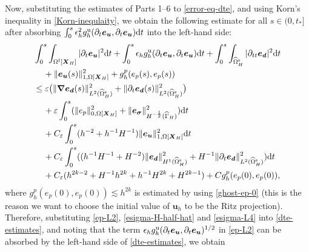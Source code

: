 \documentclass[11pt,reqno]{amsart}
\theoremstyle{definition}
\theoremstyle{plain}
\numberwithin{theorem}{section}
\numberwithin{proposition}{section}
\numberwithin{lemma}{section}
\numberwithin{equation}{section}
\newcommand{\bs}[1]{\boldsymbol{#1}}
\newcommand{\uu}[1]  {{\bs{#1}} }
\newcommand{\dep}{{{\bs{d}}}}
\newcommand{\grad}   { \uu{\nabla}    }
\def\d{\mathrm{d}}
\def\b{\color{blue}}
\renewcommand{\(}{\bigl(}
\renewcommand{\)}{\bigr)}
\begin{document}
Now, substituting the estimates of Parts 1--6 to \eqref{error-eq-dte}, and using Korn's inequality in \eqref{Korn-inequlaity}, we obtain the following estimate for all $s\in(0,t_*]$ after absorbing $\int_0^s \epsilon_h^2
g_h^{\rm u}(\partial_t{\bs e}_{\bs u},\partial_t{\bs e}_{\bs u}) \d t  $ into the left-hand side:
\begin{align} \label{dte-estimates}
& \int_0^s \int_{\Omega^{\rm f}[\bs X_H]} |\partial_t {\bs e}_{\bs u} |^2 \d t
+ \int_0^s \epsilon_h g_h^{\rm u} (\partial_t{\bs e}_{\bs u}, \partial_t{\bs e}_{\bs u}) \d t 
+ \int_0^s\int_{\widehat{\Omega}^{\rm s}_H} |\partial_{tt} {\bs e}_{\dep} |^2 \d t \notag\\
&\quad\, 
+\|{\bs e}_{\bs u}(s)\|_{1,\Omega[{\bs X}_H]}^2 
+ g^p_h(e_p(s),e_p(s)) \notag\\
&
\le 
\varepsilon
\big( \|\grad{\bs e}_{\bs d}(s)\|_{L^2(\widehat\Omega^{\rm s}_H)}^2 + \|\partial_t{\bs e}_{\bs d}(s)\|_{L^2(\widehat\Omega^{\rm s}_H)}^2 \big)\notag\\
&\quad\, 
+ \varepsilon \int_0^s ( \|e_p\|_{0,\Omega[{\bs X}_H]}^2 +\| {\bs e}_{{\bs \sigma} }\|_{H^{-\frac12}(\widehat\Gamma_H)}^2 ) \d t 
\notag\\
&\quad\, 
+ C_\varepsilon \int_0^s (h^{-2}+h^{-1}H^{-1})\| {\bs e}_{\bs u}  \|_{1,\Omega[{\bs X}_H]}^2  \d t \notag\\
&\quad\, 
+ C_\varepsilon \int_0^s ((h^{-1}H^{-1}+H^{-2})\|{\bs e}_\dep\|_{H^1(\widehat{\Omega}^{\rm s}_H)}^2 +H^{-1}\|\partial_t{\bs e}_\dep\|_{L^2(\widehat{\Omega}^{\rm s}_H)}^2) \d t \notag\\
&\quad\, 
+ C_\varepsilon (h^{2k-2} + H^{-1}h^{2k} + h^{-1}H^{2k} + H^{2k-1}) 
+ Cg^p_h(e_p(0),e_p(0)) ,
\end{align}
where $g^p_h(e_p(0),e_p(0))\lesssim h^{2k}$ is estimated by using \eqref{ghost-ep-0} (this is the reason we want to choose the initial value of ${\bs u}_h$ to be the Ritz projection). Therefore, substituting \eqref{ep-L2}, \eqref{esigma-H-half-hat} and \eqref{esigma-L4}  into \eqref{dte-estimates}, and noting that the term $\epsilon_h
g_h^{\rm u}(\partial_t{\bs e}_{\bs u},\partial_t{\bs e}_{\bs u})^{1/2}$ in \eqref{ep-L2} can be absorbed by the left-hand side of \eqref{dte-estimates}, we obtain 
\end{document}
